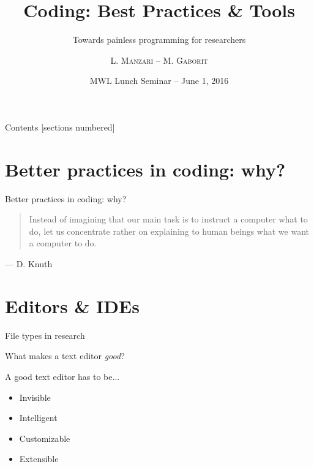 \documentclass[10pt]{beamer}
\title{Coding: Best Practices \& Tools}
\subtitle{Towards painless programming for researchers}
\author{L. \textsc{Manzari} -- M. \textsc{Gaborit}}
\date{MWL Lunch Seminar -- June 1, 2016}
\institute{}
\newcommand\fileimage[1]{%
	\draw[fill=black!2] (#1) -- ++(2,0) -- ++(0,2.5) -- ++(-1.5,0) -- ++(-.5,-.5) -- cycle;
}
\begin{document}
\maketitle

\begin{frame}{Contents}
	[sections numbered]
	\tableofcontents[hideallsubsections]
\end{frame}

\section{Better practices in coding: why?} %

\begin{frame}{Better practices in coding: why?}

	\begin{quotation}
		Instead of imagining that our main task is to instruct a
		computer what to do, let us concentrate rather on explaining to human
		beings what we want a computer to do.
	\end{quotation}
	\begin{flushright}
		--- D. Knuth
	\end{flushright}

\end{frame}

\section{Editors \& IDEs} %

\begin{frame}{File types in research} %

	\begin{center}
		\pause{}


	\end{center}
\end{frame}

\begin{frame}{What makes a text editor \emph{good}?} %

	\large
	A good text editor has to be...
		\begin{itemize}
			\item Invisible
			\item Intelligent
			\item Customizable
			\item Extensible
		\end{itemize}

\end{frame}
\end{document}

